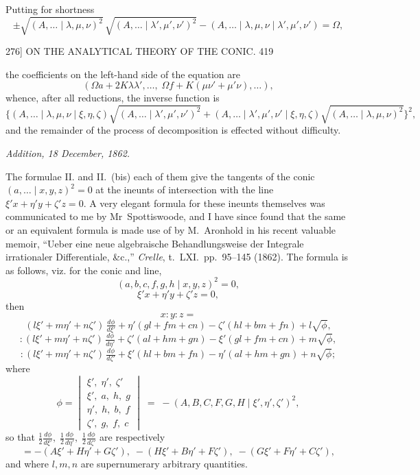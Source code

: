 \documentclass[11pt]{article}
\begin{document}
Putting for shortness
\[ \pm\sqrt{(A,\dots \mid \lambda,\mu,\nu)^{2}}\,\sqrt{(A,\dots \mid \lambda',\mu',\nu')^{2}}-(A,\dots \mid \lambda,\mu,\nu \mid \lambda',\mu',\nu')=\Omega, \]

\begin{center}
\textsc{276]} \hfill ON THE ANALYTICAL THEORY OF THE CONIC. \hfill 419
\end{center}

the coefficients on the left-hand side of the equation are
\[ (\Omega a+2K\lambda\lambda',\dots,\;\Omega f+K(\mu\nu'+\mu'\nu),\dots), \]
whence, after all reductions, the inverse function is
\[ \bigl\{(A,\dots \mid \lambda,\mu,\nu \mid \xi,\eta,\zeta)\sqrt{(A,\dots \mid \lambda',\mu',\nu')^{2}}+(A,\dots \mid \lambda',\mu',\nu' \mid \xi,\eta,\zeta)\sqrt{(A,\dots \mid \lambda,\mu,\nu)^{2}}\bigr\}^{2}, \]
and the remainder of the process of decomposition is effected without difficulty.

\medskip
\centerline{\textit{Addition, 18 December, 1862.}}
\medskip

The formulae \textsc{II.} and \textsc{II.}~(bis) each of them give the tangents of the conic
$(a,\dots \mid x,y,z)^{2}=0$ at the ineunts of intersection with the line $\xi' x+\eta' y+\zeta' z=0$. A
very elegant formula for these ineunts themselves was communicated to me by
Mr~Spottiswoode, and I have since found that the same or an equivalent formula is
made use of by M.~Aronhold in his recent valuable memoir, ``Ueber eine neue
algebraische Behandlungsweise der Integrale irrationaler Differentiale, \&c.,'' \textit{Crelle}, t.~LXI.\
pp.~95--145 (1862). The formula is as follows, viz. for the conic and line,
\[ (a,b,c,f,g,h \mid x,y,z)^{2}=0, \]
\[ \xi' x+\eta' y+\zeta' z=0, \]
then
\[ x:y:z= \]
\[ (l\xi'+m\eta'+n\zeta')\,\tfrac{d\phi}{d\xi'}+\eta'(gl+fm+cn)-\zeta'(hl+bm+fn)+l\sqrt{\phi}, \]
\[ :(l\xi'+m\eta'+n\zeta')\,\tfrac{d\phi}{d\eta'}+\zeta'(al+hm+gn)-\xi'(gl+fm+cn)+m\sqrt{\phi}, \]
\[ :(l\xi'+m\eta'+n\zeta')\,\tfrac{d\phi}{d\zeta'}+\xi'(hl+bm+fn)-\eta'(al+hm+gn)+n\sqrt{\phi}; \]
where
\[ \phi=\begin{vmatrix}
\xi',\;\eta',\;\zeta'\\
\xi',\;a,\;h,\;g\\
\eta',\;h,\;b,\;f\\
\zeta',\;g,\;f,\;c
\end{vmatrix}\;=\;-(A,B,C,F,G,H \mid \xi',\eta',\zeta')^{2}, \]
so that $\tfrac{1}{2}\tfrac{d\phi}{d\xi'},\;\tfrac{1}{2}\tfrac{d\phi}{d\eta'},\;\tfrac{1}{2}\tfrac{d\phi}{d\zeta'}$ are respectively
\[ =-(A\xi'+H\eta'+G\zeta'),\;-(H\xi'+B\eta'+F\zeta'),\;-(G\xi'+F\eta'+C\zeta'), \]
and where $l,m,n$ are supernumerary arbitrary quantities.
\end{document}

